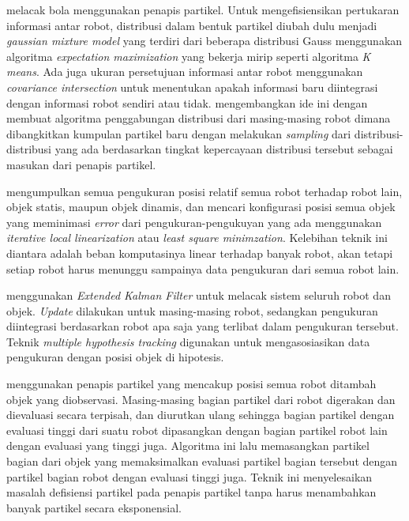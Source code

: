 \cite{santos2009} melacak bola menggunakan penapis partikel. Untuk mengefisiensikan pertukaran informasi antar robot, distribusi dalam bentuk partikel diubah dulu menjadi \textit{gaussian mixture model} yang terdiri dari beberapa distribusi Gauss menggunakan algoritma \textit{expectation maximization} yang bekerja mirip seperti algoritma \textit{K means}. Ada juga ukuran persetujuan informasi antar robot menggunakan \textit{covariance intersection} untuk menentukan apakah informasi baru diintegrasi dengan informasi robot sendiri atau tidak. \cite{ahmad2011} mengembangkan ide ini dengan membuat algoritma penggabungan distribusi dari masing-masing robot dimana dibangkitkan kumpulan partikel baru dengan melakukan \textit{sampling} dari distribusi-distribusi yang ada berdasarkan tingkat kepercayaan distribusi tersebut sebagai masukan dari penapis partikel.

\cite{ahmad2013} mengumpulkan semua pengukuran posisi relatif semua robot terhadap robot lain, objek statis, maupun objek dinamis, dan mencari konfigurasi posisi semua objek yang meminimasi \textit{error} dari pengukuran-pengukuyan yang ada menggunakan \textit{iterative local linearization} atau \textit{least square minimzation}. Kelebihan teknik ini diantara adalah beban komputasinya linear terhadap banyak robot, akan tetapi setiap robot harus menunggu sampainya data pengukuran dari semua robot lain.

\cite{chang2016} menggunakan \textit{Extended Kalman Filter} untuk melacak sistem seluruh robot dan objek. \textit{Update} dilakukan untuk masing-masing robot, sedangkan pengukuran diintegrasi berdasarkan robot apa saja yang terlibat dalam pengukuran tersebut. Teknik \textit{multiple hypothesis tracking} digunakan untuk mengasosiasikan data pengukuran dengan posisi objek di hipotesis.

\cite{ahmad2017} menggunakan penapis partikel yang mencakup posisi semua robot ditambah objek yang diobservasi. Masing-masing bagian partikel dari robot digerakan dan dievaluasi secara terpisah, dan diurutkan ulang sehingga bagian partikel dengan evaluasi tinggi dari suatu robot dipasangkan dengan bagian partikel robot lain dengan evaluasi yang tinggi juga. Algoritma ini lalu memasangkan partikel bagian dari objek yang memaksimalkan evaluasi partikel bagian tersebut dengan partikel bagian robot dengan evaluasi tinggi juga. Teknik ini menyelesaikan masalah defisiensi partikel pada penapis partikel tanpa harus menambahkan banyak partikel secara eksponensial.

